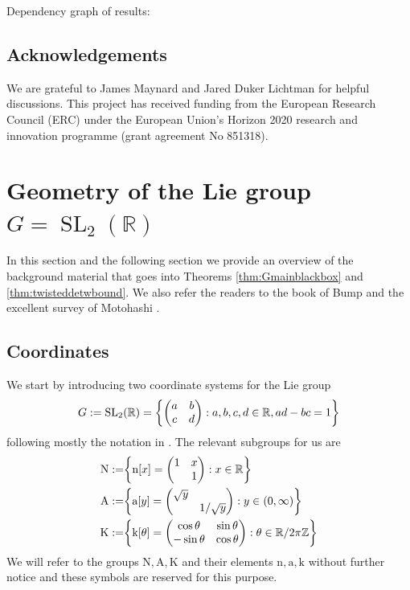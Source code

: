 \documentclass[12pt]{amsart}
\theoremstyle{definition}
\theoremstyle{remark}
\numberwithin{equation}{section}
\newcommand{\R}{{\mathbb R}}
\newcommand{\Z}{{\mathbb Z}}
\newcommand{\1}{{\mathbf 1}}
\newcommand{\SL}{\operatorname{SL}_2}
\renewcommand{\a}{\mathrm{a}}
\newcommand{\n}{\mathrm{n}}
\renewcommand{\k}{\mathrm{k}}
\renewcommand{\n}{\mathrm{n}}
\begin{document}
\begin{center}
 Dependency graph of results:
\end{center}






\subsection{Acknowledgements}
We are grateful to James Maynard and Jared Duker Lichtman for helpful discussions. This project has
received funding from the European Research Council (ERC) under the European Union's Horizon 2020 research and innovation programme (grant agreement No 851318).

\section{Geometry of the Lie group $G=\SL(\R)$} \label{sec:geomliegroup}
In this section and the following section  we provide an overview of the background material that goes into Theorems \ref{thm:Gmainblackbox} and \ref{thm:twisteddetwbound}. We also refer the readers to the book of Bump \cite{bump1997automorphic} and the excellent survey of Motohashi \cite{motohashielements}.
\subsection{Coordinates}
We start by introducing two coordinate systems for the Lie group 
\begin{align*}
 G:=  \SL(\R)  = \bigg\{ \mqty(a&b \\ c& d) : a,b,c,d \in \R, ad-bc=1  \bigg\} 
\end{align*}
following mostly the notation in \cite{motohashielements}. The relevant subgroups for us are
\begin{align*}
    \mathrm{N} :=& \bigg\{ \mathrm{n}[x] =  \mqty(1&x \\ & 1) : x \in \R  \bigg\}  \\
      \mathrm{A} := & \bigg\{ \mathrm{a}[y]= \mqty(\sqrt{y }& \\ & 1/\sqrt{y}) : y \in (0,\infty)  \bigg\} \\
        \mathrm{K} := &\bigg\{ \mathrm{k}[\theta] =  \mqty(\cos \theta & \sin \theta \\ -\sin \theta & \cos \theta) : \theta \in \R / 2\pi \Z \bigg\}  
\end{align*}
We will refer to the groups $ \mathrm{N}, \mathrm{A}, \mathrm{K}$ and their elements $\n,\a,\k$ without further notice and these symbols are reserved for this purpose.
\end{document}
